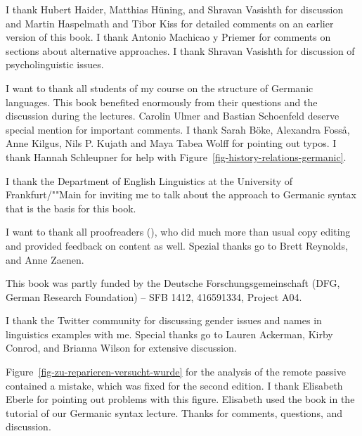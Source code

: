 \addchap{\lsAcknowledgementTitle} 

I thank Hubert Haider, Matthias Hüning, and Shravan Vasishth for discussion and Martin Haspelmath and Tibor Kiss for detailed comments
on an earlier version of this book. I thank Antonio Machicao y Priemer for comments on sections
about alternative approaches. I thank Shravan Vasishth for discussion of psycholinguistic issues.

I want to thank all students of my course on the structure of Germanic languages. This book
benefited enormously from their questions and the discussion during the lectures. 
Carolin Ulmer %
and
Bastian Schoenfeld %
deserve special mention for important comments. I thank 
Sarah Böke,
Alexandra Fosså,
Anne Kilgus,
Nils P. Kujath
and 
Maya Tabea Wolff  
for pointing out typos. I thank Hannah Schleupner for help with Figure~\ref{fig-history-relations-germanic}.

I thank the Department of English Linguistics at the University of Frankfurt/""Main for inviting me to
talk about the approach to Germanic syntax that is the basis for this book.

I want to thank all proofreaders (\makeatletter\@proofreader\makeatother), who did much more than
usual copy editing and provided feedback on 
content as well.  Spezial thanks go to Brett Reynolds, and Anne Zaenen.

This book was partly funded by the Deutsche Forschungsgemeinschaft (DFG, German Research Foundation) – SFB 1412, 416591334, Project A04.

I thank the Twitter community for discussing gender issues and names in linguistics examples with
me. Special thanks go to Lauren Ackerman, Kirby Conrod, and Brianna Wilson for extensive discussion.


Figure~\ref{fig-zu-reparieren-versucht-wurde} for the analysis of the remote passive contained a mistake, which was
fixed for the second edition. I thank Elisabeth Eberle for pointing out problems with this figure. Elisabeth used the book in the tutorial of our
Germanic syntax lecture. Thanks for comments, questions, and discussion.


